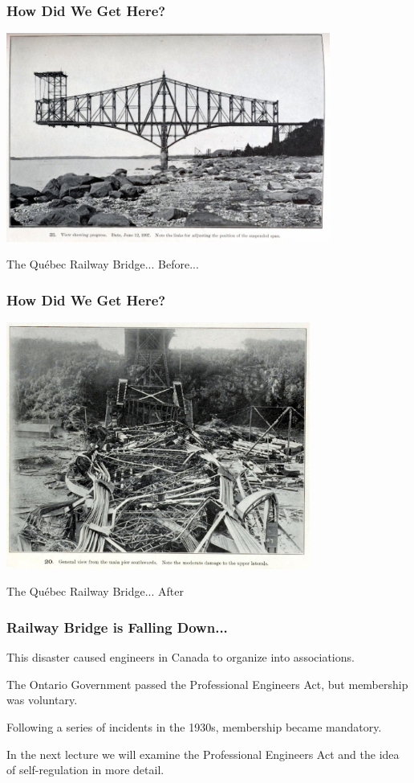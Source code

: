 \begin{frame}
\frametitle{How Did We Get Here?}

\begin{center}
	\includegraphics[width=0.8\textwidth]{images/railway-bridge}
\end{center}

The Qu\'ebec Railway Bridge... Before...

\end{frame}

\begin{frame}
\frametitle{How Did We Get Here?}

\begin{center}
	\includegraphics[width=0.75\textwidth]{images/railway-bridge2}
\end{center}

The Qu\'ebec Railway Bridge... After

\end{frame}



\begin{frame}
\frametitle{Railway Bridge is Falling Down...}

This disaster caused engineers in Canada to organize into associations.

The Ontario Government passed the Professional Engineers Act, but membership was voluntary.

Following a series of incidents in the 1930s, membership became mandatory.

In the next lecture we will examine the Professional Engineers Act and the idea of self-regulation in more detail. 

\end{frame}



